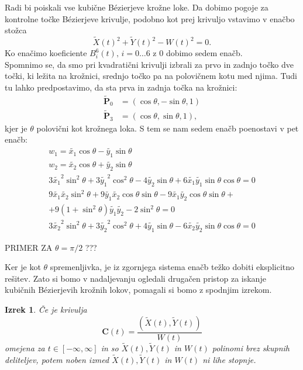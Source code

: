 \documentclass[a4paper,11pt]{article}
\theoremstyle{definition}
\theoremstyle{plain}
\newtheorem*{izrek}{Izrek}
\begin{document}
Radi bi poiskali vse kubične B\'ezierjeve krožne loke. Da dobimo pogoje za kontrolne točke B\'ezierjeve krivulje, podobno kot prej krivuljo vstavimo v enačbo stožca
$$ \tilde{X}(t)^2+\tilde{Y}(t)^2-W(t)^2=0.$$
Ko enačimo koeficiente $B_i^6(t),\,i=0\ldots6$ z $0$ dobimo sedem enačb.\\
Spomnimo se, da smo pri kvadratični krivulji izbrali za prvo in zadnjo točko dve točki, ki ležita na krožnici, srednjo točko pa na polovičnem kotu med njima. Tudi tu lahko predpostavimo, da sta prva in zadnja točka na krožnici:
\begin{align*}
\boldsymbol{\tilde{P}}_0 &= (\cos \theta, -\sin \theta, 1)\\
\boldsymbol{\tilde{P}}_3 &= (\cos \theta, \sin \theta, 1),
\end{align*}
kjer je $\theta$ polovični kot krožnega loka.  S tem se nam sedem enačb poenostavi v pet enačb:
\begin{align*}
w_1 = \tilde{x_1}\cos{\theta} - \tilde{y_1} \sin{\theta}   \\
w_2 = \tilde{x_2}\cos{\theta} + \tilde{y_2} \sin{\theta}   \\
3\tilde{x_1}^2\sin^2{\theta} + 3\tilde{y_1}^2\cos^2{\theta} - 4\tilde{y_2} \sin{\theta}  + 6\tilde{x_1}\tilde{y_1} \sin{\theta} \cos{\theta} = 0 \\
9\tilde{x_1}\tilde{x_2}\sin^2{\theta} + 9\tilde{y_1}\tilde{x_2}\cos{\theta} \sin{\theta} - 9\tilde{x_1} \tilde{y_2} \cos{\theta} \sin{\theta}+ \\
+ 9 (1 + \sin^2{\theta}) \tilde{y_1} \tilde{y_2} - 2\sin^2{\theta} = 0 \\
3\tilde{x_2}^2 \sin^2{\theta}+ 3\tilde{y_2}^2 \cos^2{\theta}+ 4\tilde{y_1} \sin{\theta}  - 6\tilde{x_2}\tilde{y_2}\sin{\theta} \cos{\theta}  = 0 
\end{align*}

PRIMER ZA $\theta=\pi/2$ ???

Ker je kot $\theta$ spremenljivka, je iz zgornjega sistema enačb težko dobiti eksplicitno rešitev. Zato si bomo v nadaljevanju ogledali drugačen pristop za iskanje kubičnih B\'ezierjevih krožnih lokov, pomagali si bomo z spodnjim izrekom.

\begin{izrek}
Če je krivulja
$$\boldsymbol{C}(t)=\frac{(\tilde{X}(t),\tilde{Y}(t))}{W(t)}$$
omejena za $t\in [-\infty,\infty]$ in so $\tilde{X}(t),\tilde{Y}(t)$ in $W(t)$ polinomi brez skupnih deliteljev, potem noben izmed $\tilde{X}(t),\tilde{Y}(t)$ in $W(t)$ ni lihe stopnje.
\end{izrek}
\end{document}
